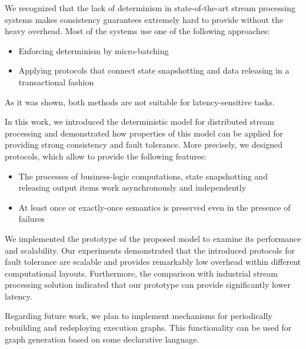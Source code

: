 
\label {fs-conclusion-seciton}

We recognized that the lack of determinism in state-of-the-art stream processing systems makes consistency guarantees extremely hard to provide without the heavy overhead. Most of the systems use one of the following approaches: 
\begin{itemize}
    \item Enforcing determinism by micro-batching
    \item Applying protocols that connect state snapshotting and data releasing in a transactional fashion
\end{itemize}

As it was shown, both methods are not suitable for latency-sensitive tasks. 

In this work, we introduced the deterministic model for distributed stream processing and demonstrated how properties of this model can be applied for providing strong consistency and fault tolerance. More precisely, we designed protocols, which allow to provide the following features:

\begin{itemize}
    \item The processes of business-logic computations, state snapshotting and releasing output items work asynchronously and independently
    \item At least once or exactly-once semantics is preserved even in the presence of failures
\end{itemize}

We implemented the prototype of the proposed model to examine its performance and scalability. Our experiments demonstrated that the introduced protocols for fault tolerance are scalable and provides remarkably low overhead within different computational layouts. Furthermore, the comparison with industrial stream processing solution indicated that our prototype can provide significantly lower latency.

Regarding future work, we plan to implement mechanisms for periodically rebuilding and redeploying execution graphs. This functionality can be used for graph generation based on some declarative language.
